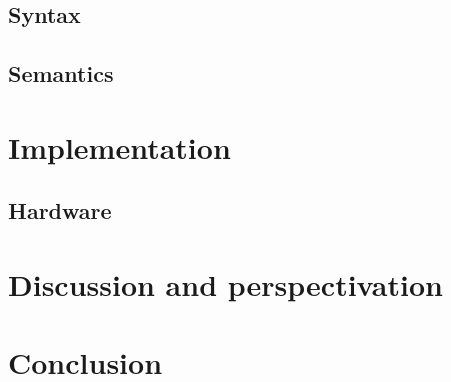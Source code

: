 \section{Syntax}
\section{Semantics}

\renewcommand{\ind}[1]{}
\chapter{Implementation}
\label{chap:implementation}
\ind{ImplementaitionIntro}
\ind{EvaluationCriteria}
\section{Hardware}
\ind{Hardware}
\ind{OverviewCompiler}
\ind{compilerchoice}
\ind{languageprocessing}
\ind{CompilationPasses}
\ind{AbstractSyntaxTrees}
\ind{ParseTree}
\ind{VisitorPattern}
\ind{SyntacticAnalysis}
\ind{KnownLexersAndParsers}
\ind{ANTLR}
\ind{LexicalAnalyzer}
\ind{Tokens}
\ind{Parser}
\ind{ContextualAnalysis}
\ind{Scoping}
\ind{Typechecking}
\ind{TheoryCodeGeneration}
\ind{CodeGeneration}
\ind{UnitTests}
\ind{ComponentSetup}
\ind{TestComponent}

\renewcommand{\ind}[1]{}
\chapter{Discussion and perspectivation}
\label{chap:disper}
\ind{FormaliaDiscussion}
\ind{FormaliaPerspektivering}

\chapter{Conclusion}
\ind{FormaliaKonklusion}


\begingroup
	\raggedright
	{}	%
\endgroup


\newpage
\listoffixmes	%

\clearforchapter
\appendix	%


\renewcommand{\ind}[1]{}
\ind{TransitionRulesAppendix}
\ind{fullcodeapp}
\ind{BilagDVD}
